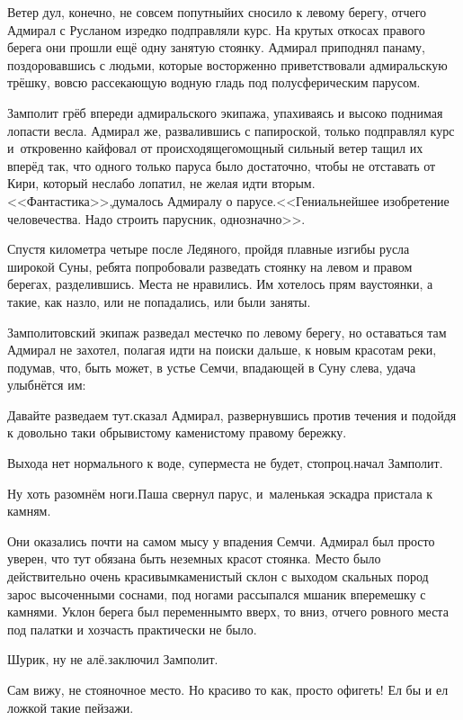 Ветер дул, конечно, не совсем попутный\mdash их сносило к левому берегу, отчего Адмирал с Русланом изредко подправляли курс. На крутых откосах правого берега они прошли ещё одну занятую стоянку. Адмирал приподнял панаму, поздоровавшись с людьми, которые восторженно приветствовали адмиральскую трёшку, вовсю рассекающую водную гладь под полусферическим парусом.

Замполит грёб впереди адмиральского экипажа, упахиваясь и высоко поднимая лопасти весла. Адмирал же, развалившись с папироской, только подправлял курс и~откровенно кайфовал от происходящего\mdash мощный сильный ветер тащил их вперёд так, что одного только паруса было достаточно, чтобы не отставать от Кири, который неслабо лопатил, не желая идти вторым. <<Фантастика>>,\mdash думалось Адмиралу о парусе.\mdash<<Гениальнейшее изобретение человечества. Надо строить парусник, однозначно>>.

Спустя километра четыре после Ледяного, пройдя плавные изгибы русла широкой Суны, ребята попробовали разведать стоянку на левом и правом берегах, разделившись. Места не нравились. Им хотелось прям вау\sdash стоянки, а такие, как назло, или не попадались, или были заняты.

Замполитовский экипаж разведал местечко по левому берегу, но оставаться там Адмирал не захотел, полагая идти на поиски дальше, к новым красотам реки, подумав, что, быть может, в устье Семчи, впадающей в Суну слева, удача улыбнётся им:

\diagdash Давайте разведаем тут.\mdash сказал Адмирал, развернувшись против течения и подойдя к довольно таки обрывистому каменистому правому бережку.

\diagdash Выхода нет нормального к воде, супер\sdash места не будет, стопроц.\mdash начал Замполит.

\diagdash Ну хоть разомнём ноги.\mdash Паша свернул парус, и~маленькая эскадра пристала к камням.

Они оказались почти на самом мысу у впадения Семчи. Адмирал был просто уверен, что тут обязана быть неземных красот стоянка. Место было действительно очень красивым\mdash каменистый склон с выходом скальных пород зарос высоченными соснами, под ногами рассыпался мшаник вперемешку с камнями. Уклон берега был переменным\mdash то вверх, то вниз, отчего ровного места под палатки и хозчасть практически не было.

\diagdash Шурик, ну не алё.\mdash заключил Замполит.

\diagdash Сам вижу, не стояночное место. Но красиво то как, просто офигеть! Ел бы и ел ложкой такие пейзажи.

